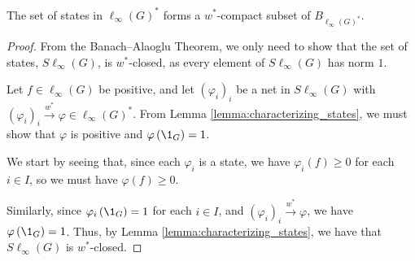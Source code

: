 \begin{corollary}
  The set of states in $\ell_{\infty}\left(G\right)^{\ast}$ forms a $w^{\ast}$-compact subset of $B_{\ell_{\infty}\left(G\right)^{\ast}}$.
\end{corollary}
\begin{proof}
  From the Banach--Alaoglu Theorem, we only need to show that the set of states, $S\ell_{\infty}\left(G\right)$, is $w^{\ast}$-closed, as every element of $S\ell_{\infty}\left(G\right)$ has norm $1$.\newline

  Let $f\in \ell_{\infty}\left(G\right)$ be positive, and let $\left(\varphi_{i}\right)_i$ be a net in $S\ell_{\infty}\left(G\right)$ with $\left(\varphi_{i}\right)_i\xrightarrow{w^{\ast}} \varphi\in \ell_{\infty}\left(G\right)^{\ast}$. From Lemma \ref{lemma:characterizing_states}, we must show that $\varphi$ is positive and $\varphi\left(\1_{G}\right) = 1$.\newline

  We start by seeing that, since each $\varphi_i$ is a state, we have $\varphi_{i}\left(f\right) \geq 0$ for each $i\in I$, so we must have $\varphi\left(f\right) \geq 0$.\newline

  Similarly, since $\varphi_{i}\left(\1_{G}\right) = 1$ for each $i\in I$, and $\left(\varphi_i\right)_i \xrightarrow{w^{\ast}} \varphi$, we have $\varphi\left(\1_{G}\right) = 1$. Thus, by Lemma \ref{lemma:characterizing_states}, we have that $S\ell_{\infty}\left(G\right)$ is $w^{\ast}$-closed.
\end{proof}

